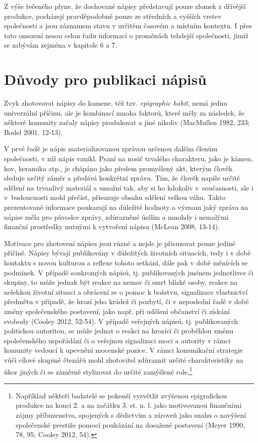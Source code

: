 Z výše řečeného plyne, že dochované nápisy představují pouze zlomek z dřívější produkce, pocházejí pravděpodobně pouze ze středních a vyšších vrstev společnosti a jsou záznamem stavu v určitém časovém a místním kontextu. I přes tato omezení nesou celou řadu informací o proměnách tehdejší společnosti, jimiž se zabývám zejména v kapitole 6 a 7.

\section[důvody-pro-publikaci-nápisů]{Důvody pro publikaci nápisů}

Zvyk zhotovovat nápisy do kamene, též tzv. {\em epigraphic habit}, nemá jednu univerzální příčinu, ale je kombinací mnoha faktorů, které měly za následek, že některé komunity začaly nápisy produkovat a jiné nikoliv (MacMullen 1982, 233; Bodel 2001, 12-13).

V prvé řadě je nápis materializovanou zprávou určenou dalším členům společnosti, v níž nápis vznikl. Psaní na nosič trvalého charakteru, jako je kámen, kov, keramika atp., je chápáno jako předem promyšlený akt, kterým člověk sleduje určitý záměr a předává konkrétní zprávu. Tím, že člověk napíše určité sdělení na trvanlivý materiál a umožní tak, aby si ho kdokoliv v~současnosti, ale i v~budoucnosti mohl přečíst, přisuzuje obsahu sdělení velkou váhu. Takto prezentované informace poukazují na důležité hodnoty a význam jaký zpráva na nápise měla pro původce zprávy, zdůrazněné úsilím a mnohdy i nemalými finanční prostředky nutnými k vytvoření nápisu (McLean 2008, 13-14).

Motivace pro zhotovení nápisu jsou různé a nejde je přisuzovat pouze jediné příčině. Nápisy bývají publikovány v důležitých životních situacích, tedy i v době kontaktu s novou kulturou a reflexe tohoto setkání, dále pak v době měnících se podmínek. V případě soukromých nápisů, tj. publikovaných jménem jednotlivce či skupiny, to může jednak být reakce na nemoc či smrt blízké osoby, reakce na nelehkou životní situaci a obrácení se o pomoc k božstvu, signalizace vlastnictví předmětu v případě, že hrozí jeho krádež či pozbytí, či v neposlední řadě v době změny společenského postavení, jako např. při udělení občanství či získání svobody (Cooley 2012, 52-54). V případě veřejných nápisů, tj. publikovaných politickou autoritou, se může jednat o reakci na hrozící či proběhlou změnu společenského uspořádání či o veřejnou signalizaci moci a autority v rámci komunity vedoucí k upevnění mocenské pozice. V rámci komunikační strategie vůči cílové skupině čtenářů mohl zhotovitel zdůraznit určité charakteristiky na úkor jiných či se záměrně stylizovat do určité zamýšlené role.\footnote{Například někteří badatelé se pokouší vysvětlit zvýšenou epigrafickou produkce na konci 2. a na začátku 3. st. n. l. jako motivovanou finančními zájmy příbuzenstva, spojených s dědictvím a zároveň jako snahu o navýšení společenské prestiže pomocí poukázání na dosažené postavení (Meyer 1990, 78, 95; Cooley 2012, 54).}

